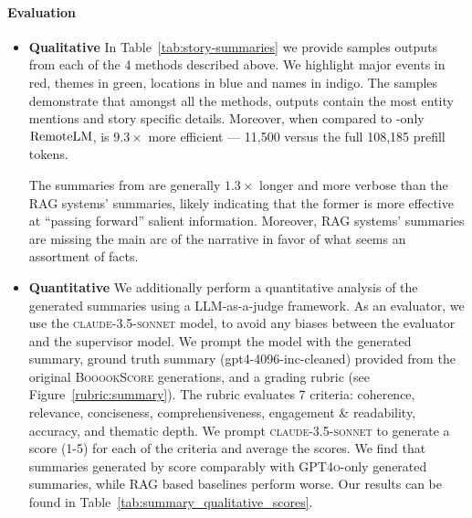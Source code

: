 \paragraph{Evaluation}
\begin{itemize}
    \setlength{\itemindent}{-1em}
    \item \textbf{Qualitative} In Table~\ref{tab:story-summaries} we provide samples outputs from each of the 4 methods described above. We highlight major events in red, themes in green, locations in blue and names in indigo. The samples demonstrate that amongst all the methods, \system outputs contain the most entity mentions and story specific details. Moreover, when compared to \gpt-only $\mathrm{RemoteLM}$,
\system is $9.3\times$ more efficient --- 11,500 versus the full 108,185 prefill tokens.

The summaries from \system are generally $1.3\times$ longer and more verbose than the RAG systems' summaries, likely indicating that the former is more effective at ``passing forward'' salient information. Moreover, RAG systems' summaries are missing the main arc of the narrative in favor of what seems an assortment of facts.  
    \setlength{\itemindent}{-1em}
    \item \textbf{Quantitative} We additionally perform a quantitative analysis of the generated summaries using a LLM-as-a-judge framework. As an evaluator, we use the \textsc{claude-3.5-sonnet} model, to avoid any biases between the evaluator and the supervisor model. We prompt the model with the generated summary, ground truth summary (gpt4-4096-inc-cleaned) provided from the original \textsc{BooookScore} generations, and a grading rubric (see Figure~\ref{rubric:summary}). The rubric evaluates 7 criteria: coherence, relevance, conciseness, comprehensiveness, engagement \& readability, accuracy, and thematic depth. We prompt \textsc{claude-3.5-sonnet} to generate a score (1-5) for each of the criteria and average the scores. We find that summaries generated by \system score comparably with \textsc{GPT4o}-only generated summaries, while RAG based baselines perform worse. Our results can be found in Table~\ref{tab:summary_qualitative_scores}.
\end{itemize}



